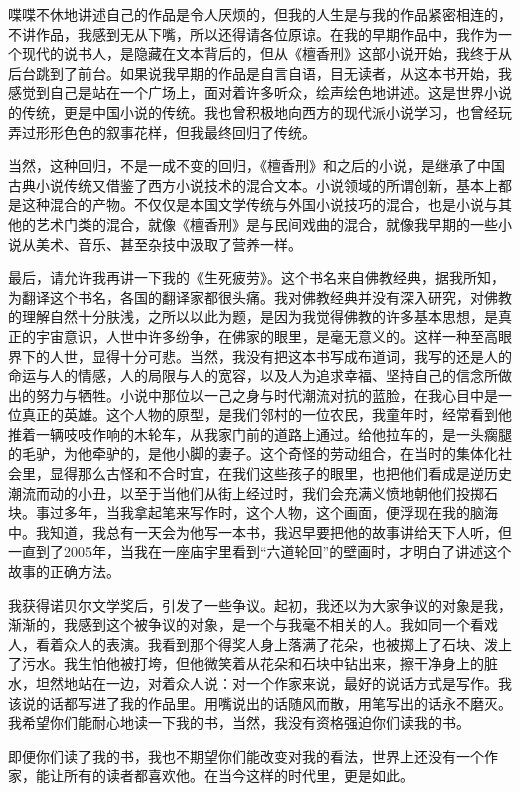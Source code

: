 \documentclass[12pt,a5paper]{ctexbook}
\begin{document}
喋喋不休地讲述自己的作品是令人厌烦的，但我的人生是与我的作品紧密相连的，不讲作品，我感到无从下嘴，所以还得请各位原谅。在我的早期作品中，我作为一个现代的说书人，是隐藏在文本背后的，但从《檀香刑》这部小说开始，我终于从后台跳到了前台。如果说我早期的作品是自言自语，目无读者，从这本书开始，我感觉到自己是站在一个广场上，面对着许多听众，绘声绘色地讲述。这是世界小说的传统，更是中国小说的传统。我也曾积极地向西方的现代派小说学习，也曾经玩弄过形形色色的叙事花样，但我最终回归了传统。

当然，这种回归，不是一成不变的回归，《檀香刑》和之后的小说，是继承了中国古典小说传统又借鉴了西方小说技术的混合文本。小说领域的所谓创新，基本上都是这种混合的产物。不仅仅是本国文学传统与外国小说技巧的混合，也是小说与其他的艺术门类的混合，就像《檀香刑》是与民间戏曲的混合，就像我早期的一些小说从美术、音乐、甚至杂技中汲取了营养一样。

最后，请允许我再讲一下我的《生死疲劳》。这个书名来自佛教经典，据我所知，为翻译这个书名，各国的翻译家都很头痛。我对佛教经典并没有深入研究，对佛教的理解自然十分肤浅，之所以以此为题，是因为我觉得佛教的许多基本思想，是真正的宇宙意识，人世中许多纷争，在佛家的眼里，是毫无意义的。这样一种至高眼界下的人世，显得十分可悲。当然，我没有把这本书写成布道词，我写的还是人的命运与人的情感，人的局限与人的宽容，以及人为追求幸福、坚持自己的信念所做出的努力与牺牲。小说中那位以一己之身与时代潮流对抗的蓝脸，在我心目中是一位真正的英雄。这个人物的原型，是我们邻村的一位农民，我童年时，经常看到他推着一辆吱吱作响的木轮车，从我家门前的道路上通过。给他拉车的，是一头瘸腿的毛驴，为他牵驴的，是他小脚的妻子。这个奇怪的劳动组合，在当时的集体化社会里，显得那么古怪和不合时宜，在我们这些孩子的眼里，也把他们看成是逆历史潮流而动的小丑，以至于当他们从街上经过时，我们会充满义愤地朝他们投掷石块。事过多年，当我拿起笔来写作时，这个人物，这个画面，便浮现在我的脑海中。我知道，我总有一天会为他写一本书，我迟早要把他的故事讲给天下人听，但一直到了2005年，当我在一座庙宇里看到“六道轮回”的壁画时，才明白了讲述这个故事的正确方法。

我获得诺贝尔文学奖后，引发了一些争议。起初，我还以为大家争议的对象是我，渐渐的，我感到这个被争议的对象，是一个与我毫不相关的人。我如同一个看戏人，看着众人的表演。我看到那个得奖人身上落满了花朵，也被掷上了石块、泼上了污水。我生怕他被打垮，但他微笑着从花朵和石块中钻出来，擦干净身上的脏水，坦然地站在一边，对着众人说：对一个作家来说，最好的说话方式是写作。我该说的话都写进了我的作品里。用嘴说出的话随风而散，用笔写出的话永不磨灭。我希望你们能耐心地读一下我的书，当然，我没有资格强迫你们读我的书。

即便你们读了我的书，我也不期望你们能改变对我的看法，世界上还没有一个作家，能让所有的读者都喜欢他。在当今这样的时代里，更是如此。
\end{document}
